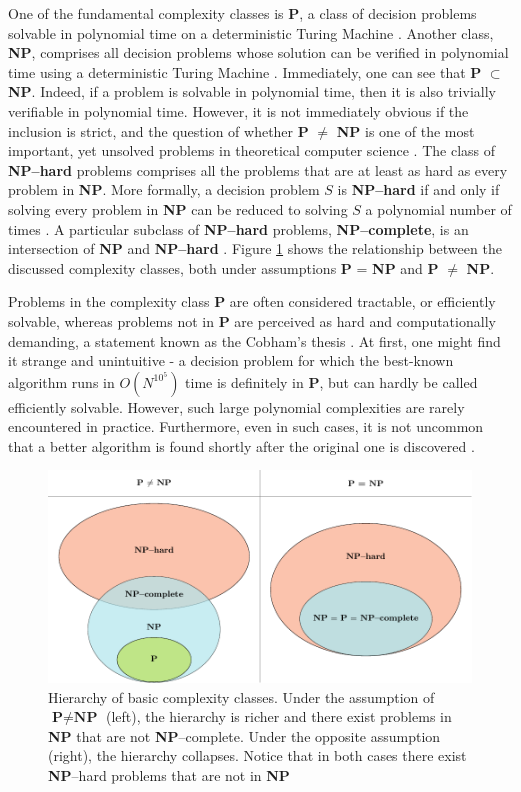 One of the fundamental complexity classes is \textbf{P}, a class of decision
problems solvable in polynomial time on a deterministic Turing Machine
\cite{arora}. Another class, \textbf{NP}, comprises all decision problems whose
solution can be verified in polynomial time using a deterministic Turing
Machine \cite{arora}. Immediately, one can see that \textbf{P} $\subset$
\textbf{NP}. Indeed, if a problem is solvable in polynomial time, then it is
also trivially verifiable in polynomial time. However, it is not immediately
obvious if the inclusion is strict, and the question of whether \textbf{P}
$\ne$ \textbf{NP} is one of the most important, yet unsolved problems in
theoretical computer science \cite{fortnow}. The class of \textbf{NP--hard}
problems comprises all the problems that are at least as hard as every problem
in \textbf{NP}. More formally, a decision problem $S$ is \textbf{NP--hard} if
and only if solving every problem in \textbf{NP} can be reduced to solving $S$
a polynomial number of times \cite{arora}. A particular subclass of
\textbf{NP--hard} problems, \textbf{NP--complete}, is an intersection of
\textbf{NP} and \textbf{NP--hard} \cite{arora}. Figure \ref{fig:complexity}
shows the relationship between the discussed complexity classes, both under
assumptions \textbf{P} = \textbf{NP} and \textbf{P} $\ne$ \textbf{NP}.

Problems in the complexity class \textbf{P} are often considered tractable, or
efficiently solvable, whereas problems not in \textbf{P} are perceived as hard
and computationally demanding, a statement known as the Cobham's thesis
\cite{cobham, arora}. At first, one might find it strange and unintuitive - a
decision problem for which the best-known algorithm runs in $O(N^{10^5})$ time
is definitely in \textbf{P}, but can hardly be called efficiently solvable.
However, such large polynomial complexities are rarely encountered in practice.
Furthermore, even in such cases, it is not uncommon that a better algorithm is
found shortly after the original one is discovered \cite{arora}.

\begin{figure}
  \includegraphics[width=\textwidth]{figures/complexity_new.pdf}
  \caption{Hierarchy of basic complexity classes. Under the assumption of $\textbf{P} \ne
      \textbf{NP}$ (left), the hierarchy is richer and there exist problems in
    \textbf{NP} that are not \textbf{NP}--complete. Under the opposite assumption
    (right), the hierarchy collapses. Notice that in both cases there exist
    \textbf{NP}--hard problems that are not in \textbf{NP} } \label{fig:complexity}
\end{figure}

